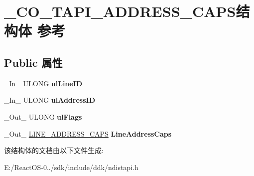 \hypertarget{struct___c_o___t_a_p_i___a_d_d_r_e_s_s___c_a_p_s}{}\section{\+\_\+\+C\+O\+\_\+\+T\+A\+P\+I\+\_\+\+A\+D\+D\+R\+E\+S\+S\+\_\+\+C\+A\+P\+S结构体 参考}
\label{struct___c_o___t_a_p_i___a_d_d_r_e_s_s___c_a_p_s}
\subsection*{Public 属性}
\begin{DoxyCompactItemize}
\item 
\mbox{\label{struct___c_o___t_a_p_i___a_d_d_r_e_s_s___c_a_p_s_a378a3def145e91cd0c768e8ad5860a61}} 
\+\_\+\+In\+\_\+ U\+L\+O\+NG {\bfseries ul\+Line\+ID}
\item 
\mbox{\label{struct___c_o___t_a_p_i___a_d_d_r_e_s_s___c_a_p_s_aa04b4934b46952a0ccc3d89f7ad992b6}} 
\+\_\+\+In\+\_\+ U\+L\+O\+NG {\bfseries ul\+Address\+ID}
\item 
\mbox{\label{struct___c_o___t_a_p_i___a_d_d_r_e_s_s___c_a_p_s_abc92ace0649de5b6b5dd3097d2218091}} 
\+\_\+\+Out\+\_\+ U\+L\+O\+NG {\bfseries ul\+Flags}
\item 
\mbox{\label{struct___c_o___t_a_p_i___a_d_d_r_e_s_s___c_a_p_s_ad6748fe80ecbb075666a59752ccb7e9d}} 
\+\_\+\+Out\+\_\+ \hyperlink{struct___l_i_n_e___a_d_d_r_e_s_s___c_a_p_s}{L\+I\+N\+E\+\_\+\+A\+D\+D\+R\+E\+S\+S\+\_\+\+C\+A\+PS} {\bfseries Line\+Address\+Caps}
\end{DoxyCompactItemize}


该结构体的文档由以下文件生成\+:\begin{DoxyCompactItemize}
\item 
E\+:/\+React\+O\+S-\/0../sdk/include/ddk/ndistapi.\+h\end{DoxyCompactItemize}
